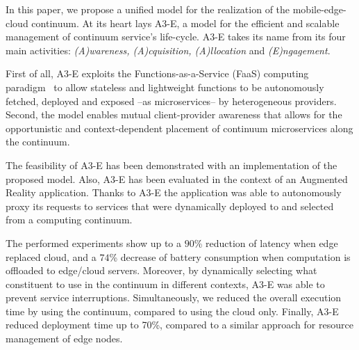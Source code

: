 In this paper, we propose a unified model for the realization of the mobile-edge-cloud continuum. At its heart lays A3-E, a model for the efficient and scalable management of continuum service's life-cycle. A3-E takes its name from its four main activities: \textit{(A)wareness, (A)cquisition, (A)llocation} and \textit{(E)ngagement}. 

First of all, A3-E exploits the Functions-as-a-Service (FaaS) computing paradigm~\cite{Hendrickson:2016,baldini2017serverless,GarrigaMendonca2017} to allow stateless and lightweight functions to be autonomously fetched, deployed and exposed --as microservices-- by heterogeneous providers. Second, the model enables mutual client-provider awareness that allows for the opportunistic and context-dependent placement of continuum microservices along the continuum. 

The feasibility of A3-E has been demonstrated with an implementation of the proposed model. Also, A3-E has been evaluated in the context of an Augmented Reality application. Thanks to A3-E the application was able to autonomously proxy its requests to services that were dynamically deployed to and selected from a computing continuum. 


The performed experiments show up to a $90$\% reduction of latency when edge replaced cloud, and a $74$\% decrease of battery consumption when computation is offloaded 
to edge/cloud servers. Moreover, by dynamically selecting what constituent to use in the continuum in different contexts, 
A3-E was able to prevent service interruptions. Simultaneously, we reduced the overall execution time by using the continuum, compared to using the cloud only. Finally, A3-E reduced deployment time up to 70\%, compared to a similar approach for resource management of edge nodes.






